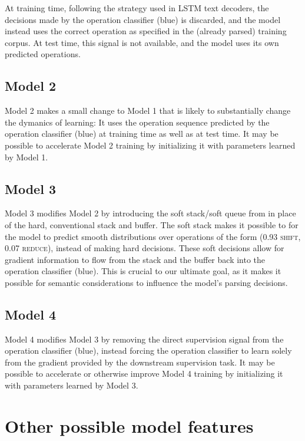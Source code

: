 \documentclass[11pt,letterpaper]{article}
\newcommand{\shift}{\textsc{shift}}
\newcommand{\reduce}{\textsc{reduce}}
\begin{document}
At training time, following the strategy used in LSTM text decoders, the decisions made by the operation classifier (blue) is discarded, and the model instead uses the correct operation as specified in the (already parsed) training corpus. At test time, this signal is not available, and the model uses its own predicted operations.

\subsection{Model 2}

Model 2 makes a small change to Model 1 that is likely to substantially change the dymanics of learning: It uses the operation sequence predicted by the operation classifier (blue) at training time as well as at test time. It may be possible to accelerate Model 2 training by initializing it with parameters learned by Model 1.

\subsection{Model 3}

Model 3 modifies Model 2 by introducing the soft stack/soft queue from \cite{grefenstette2015learning} in place of the hard, conventional stack and buffer. The soft stack makes it possible to for the model to predict smooth distributions over operations of the form (0.93 \shift, 0.07 \reduce), instead of making hard decisions. These soft decisions allow for gradient information to flow from the stack and the buffer back into the operation classifier (blue). This is crucial to our ultimate goal, as it makes it possible for semantic considerations to influence the model's parsing decisions.

\subsection{Model 4}

Model 4 modifies Model 3 by removing the direct supervision signal from the operation classifier (blue), instead forcing the operation classifier to learn solely from the gradient provided by the downstream supervision task. It may be possible to accelerate or otherwise improve Model 4 training by initializing it with parameters learned by Model 3.

\section{Other possible model features}
\end{document}
